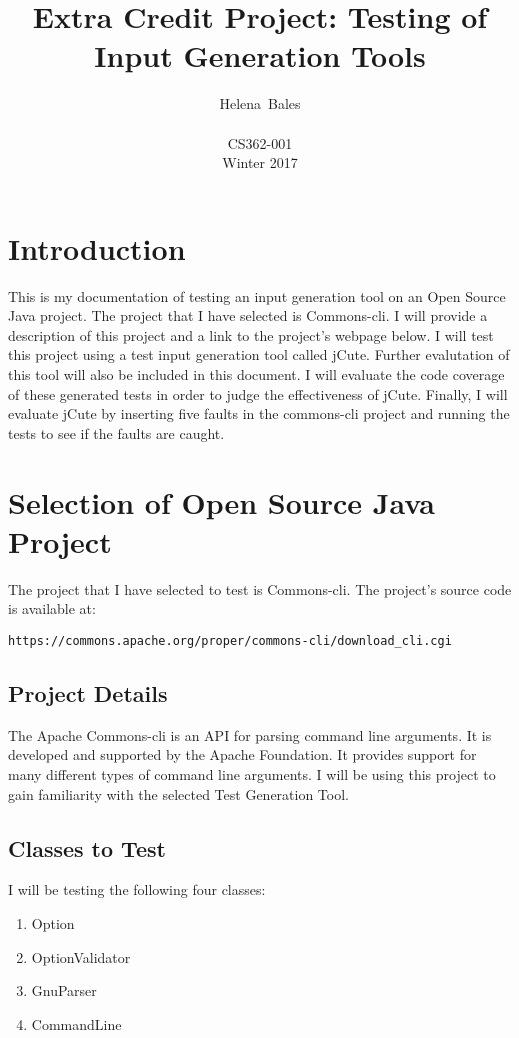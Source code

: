 \documentclass[letterpaper,10pt]{article}
\title{Extra Credit Project: Testing of Input Generation Tools}
\author{Helena~Bales\\ \\ CS362-001 \\ Winter 2017}
\begin{document}
\maketitle

\clearpage
\tableofcontents
\clearpage

\section{Introduction}
This is my documentation of testing an input generation tool on an Open Source Java project. 
The project that I have selected is Commons-cli. I will provide a description of this project and a 
link to the project's webpage below. I will test this project using a test input generation tool 
called jCute. Further evalutation of this tool will also be included in this document. I will 
evaluate the code coverage of these generated tests in order to judge the effectiveness of jCute. 
Finally, I will evaluate jCute by inserting five faults in the commons-cli project and running the 
tests to see if the faults are caught.

\section{Selection of Open Source Java Project}
The project that I have selected to test is Commons-cli. The project's source code is available at: 
\begin{lstlisting}
https://commons.apache.org/proper/commons-cli/download_cli.cgi
\end{lstlisting}

	\subsection{Project Details}
	The Apache Commons-cli is an API for parsing command line arguments. It is developed and 
	supported by the Apache Foundation. It provides support for many different types of 
	command line arguments. I will be using this project to gain familiarity with the 
	selected Test Generation Tool.
	\subsection{Classes to Test}
	I will be testing the following four classes:
	\begin{enumerate}
		\item{Option}
		\item{OptionValidator}
		\item{GnuParser}
		\item{CommandLine}
	\end{enumerate}
\end{document}
